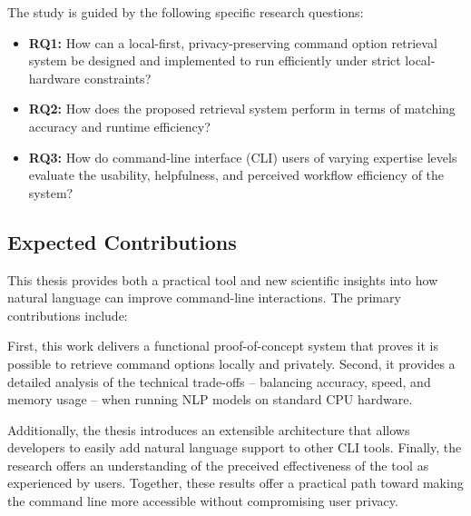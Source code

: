 The study is guided by the following specific research questions:

\begin{itemize}
    \item \textbf{RQ1:} How can a local-first, privacy-preserving command option retrieval system be designed and implemented to run efficiently under strict local-hardware constraints?
    \item \textbf{RQ2:} How does the proposed retrieval system perform in terms of matching accuracy and runtime efficiency?
    \item \textbf{RQ3:} How do command-line interface (CLI) users of varying expertise levels evaluate the usability, helpfulness, and perceived workflow efficiency of the system?
\end{itemize}
% 


\subsection{Expected Contributions}

This thesis provides both a practical tool and new scientific insights into how natural language can improve command-line interactions. The primary contributions include:

First, this work delivers a functional proof-of-concept system that proves it is possible to retrieve command options locally and privately. Second, it provides a detailed analysis of the technical trade-offs -- balancing accuracy, speed, and memory usage -- when running NLP models on standard CPU hardware.

Additionally, the thesis introduces an extensible architecture that allows developers to easily add natural language support to other CLI tools. Finally, the research offers an  understanding of the preceived effectiveness of the tool as experienced by users.
Together, these results offer a practical path toward making the command line more accessible without compromising user privacy.